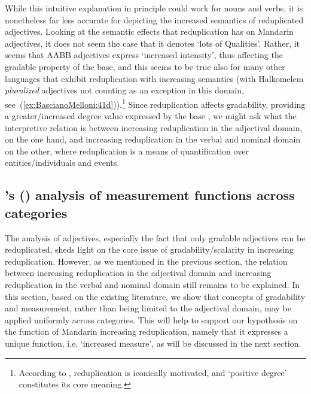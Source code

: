 \documentclass[output=paper]{langsci/langscibook}
\begin{document}
While this intuitive explanation in principle could work for nouns and
verbs, it is nonetheless far less accurate for depicting the increased
semantics of reduplicated adjectives. Looking at the semantic effects
that reduplication has on Mandarin adjectives, it does not seem the case
that it denotes `lots of Qualities'. Rather, it seems that AABB
adjectives express `increased intensity', thus affecting the gradable
property of the base, and this seems to be true also for many other
languages that exhibit reduplication with increasing semantics (with
Halkomelem \emph{pluralized} adjectives not counting as an exception in
this domain, see~(\ref{ex:BascianoMelloni:41d})).\footnote{According to %
\citet[]{Xu2012a}%
%
, reduplication is
  iconically motivated, and `positive degree' constitutes its core
  meaning.} Since reduplication affects gradability, providing a
greater/increased degree value expressed by the base , we might ask
what the interpretive relation is between increasing reduplication in
the adjectival domain, on the one hand, and increasing reduplication in
the verbal and nominal domain on the other, where reduplication is a
means of quantification over entities/individuals and events.

\subsection{%
\citeauthor{Wellwood2014}'s (\citeyear{Wellwood2014,Wellwood2015}) %
%
analysis of measurement functions
across categories }

The analysis of adjectives, especially the fact that only gradable
adjectives can be reduplicated, sheds light on the core issue of
gradability/scalarity in increasing reduplication. However, as we
mentioned in the previous section, the relation between increasing
reduplication in the adjectival domain and increasing reduplication in
the verbal and nominal domain still remains to be explained. In this
section, based on the existing literature, we show that concepts of
gradability and measurement, rather than being limited to the adjectival
domain, may be applied uniformly across categories. This will help to
support our hypothesis on the function of Mandarin increasing
reduplication, namely that it expresses a unique function, i.e.
`increased measure', as will be discussed in the next section.
\end{document}

